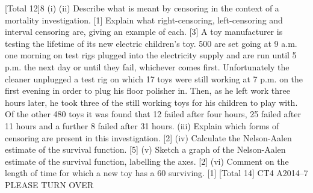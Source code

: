 \documentclass[a4paper,12pt]{article}
\begin{document}
\begin{enumerate}

[Total 12]8
(i)
(ii)
Describe what is meant by censoring in the context of a mortality
investigation.
[1]
Explain what right-censoring, left-censoring and interval censoring are, giving
an example of each.
[3]
A toy manufacturer is testing the lifetime of its new electric children’s toy. 500 are
set going at 9 a.m. one morning on test rigs plugged into the electricity supply and are
run until 5 p.m. the next day or until they fail, whichever comes first. Unfortunately
the cleaner unplugged a test rig on which 17 toys were still working at 7 p.m. on the
first evening in order to plug his floor polisher in. Then, as he left work three hours
later, he took three of the still working toys for his children to play with. Of the other
480 toys it was found that 12 failed after four hours, 25 failed after 11 hours and a
further 8 failed after 31 hours.
(iii) Explain which forms of censoring are present in this investigation. [2]
(iv) Calculate the Nelson-Aalen estimate of the survival function. [5]
(v) Sketch a graph of the Nelson-Aalen estimate of the survival function, labelling
the axes.
[2]
(vi) Comment on the length of time for which a new toy has a 60%
surviving.
[1]
[Total 14]
CT4 A2014–7
PLEASE TURN OVER

\newapge


\end{enumerate}
\end{document}
